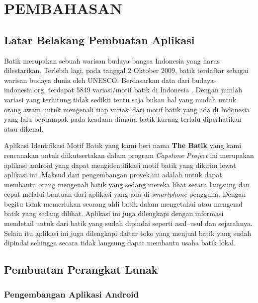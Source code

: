 \chapter{PEMBAHASAN}


\section{Latar Belakang Pembuatan Aplikasi}

Batik merupakan sebuah warisan budaya bangsa Indonesia yang harus dilestarikan.
Terlebih lagi, pada tanggal 2 Oktober 2009, batik terdaftar sebagai warisan budaya dunia oleh UNESCO.
Berdasarkan data dari budaya-indonesia.org, terdapat 5849 variasi/motif batik di Indonesia \cite{jumlahBatik}.
Dengan jumlah variasi yang terhitung tidak sedikit tentu saja bukan hal yang mudah untuk orang awam untuk mengenali tiap variasi dari motif batik yang ada di Indonesia yang lalu berdampak pada keadaan dimana batik kurang terlalu diperhatikan atau dikenal.

Aplikasi Identifikasi Motif Batik yang kami beri nama \textbf{The Batik} yang kami rencanakan untuk diikutsertakan dalam program \textit{Capstone Project} ini merupakan aplikasi android yang dapat mengidentifikasi motif batik yang dikirim lewat aplikasi ini.
Maksud dari pengembangan proyek ini adalah untuk dapat membantu orang mengenali batik yang sedang mereka lihat secara langsung dan cepat melalui bantuan dari aplikasi yang ada di \textit{smartphone} pengguna.
Dengan begitu tidak memerlukan seorang ahli batik dalam mengetahui atau mengenal batik yang sedang dilihat.
Aplikasi ini juga dilengkapi dengan informasi mendetail untuk dari batik yang sudah dipindai seperti asal–usul dan sejarahnya.
Selain itu aplikasi ini juga dilengkapi daftar toko yang menjual batik yang sudah dipindai sehingga secara tidak langsung dapat membantu usaha batik lokal.

\section{Pembuatan Perangkat Lunak}

  \subsection{Pengembangan Aplikasi Android}


